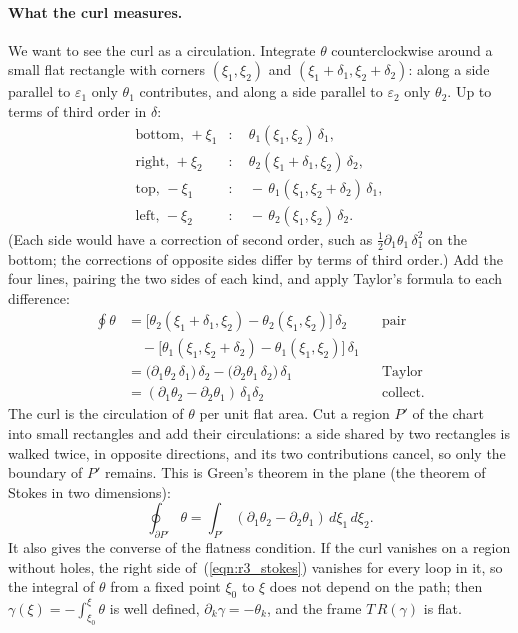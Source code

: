 \paragraph{What the curl measures.} We want to see the curl as a circulation. Integrate $\theta$ counterclockwise around a small flat rectangle with corners $(\xi_1, \xi_2)$ and $(\xi_1 + \delta_1, \xi_2 + \delta_2)$: along a side parallel to $\varepsilon_1$ only $\theta_1$ contributes, and along a side parallel to $\varepsilon_2$ only $\theta_2$. Up to terms of third order in $\delta$:
\begin{align*}
\text{bottom, } +\xi_1 &:\quad \theta_1(\xi_1, \xi_2)\,\delta_1 , \\
\text{right, } +\xi_2 &:\quad \theta_2(\xi_1 + \delta_1, \xi_2)\,\delta_2 , \\
\text{top, } -\xi_1 &:\quad -\,\theta_1(\xi_1, \xi_2 + \delta_2)\,\delta_1 , \\
\text{left, } -\xi_2 &:\quad -\,\theta_2(\xi_1, \xi_2)\,\delta_2 .
\end{align*}
(Each side would have a correction of second order, such as $\frac12\partial_1\theta_1\,\delta_1^2$ on the bottom; the corrections of opposite sides differ by terms of third order.) Add the four lines, pairing the two sides of each kind, and apply Taylor's formula to each difference:
\begin{align*}
\oint\theta &= \big[\theta_2(\xi_1 + \delta_1, \xi_2) - \theta_2(\xi_1, \xi_2)\big]\,\delta_2 && \text{pair} \\
&\quad - \big[\theta_1(\xi_1, \xi_2 + \delta_2) - \theta_1(\xi_1, \xi_2)\big]\,\delta_1 \\
&= \big(\partial_1\theta_2\,\delta_1\big)\,\delta_2 - \big(\partial_2\theta_1\,\delta_2\big)\,\delta_1 && \text{Taylor} \\
&= (\partial_1\theta_2 - \partial_2\theta_1)\,\delta_1\delta_2 && \text{collect.}
\end{align*}
The curl is the circulation of $\theta$ per unit flat area. Cut a region $P'$ of the chart into small rectangles and add their circulations: a side shared by two rectangles is walked twice, in opposite directions, and its two contributions cancel, so only the boundary of $P'$ remains. This is Green's theorem in the plane (the theorem of Stokes in two dimensions):
\begin{equation}
\label{eqn:r3_stokes}
\oint_{\partial P'} \theta = \int_{P'} (\partial_1\theta_2 - \partial_2\theta_1)\, d\xi_1\, d\xi_2 .
\end{equation}
It also gives the converse of the flatness condition. If the curl vanishes on a region without holes, the right side of~(\ref{eqn:r3_stokes}) vanishes for every loop in it, so the integral of $\theta$ from a fixed point $\xi_0$ to $\xi$ does not depend on the path; then $\gamma(\xi) = -\int_{\xi_0}^{\xi}\theta$ is well defined, $\partial_k\gamma = -\theta_k$, and the frame $T\,R(\gamma)$ is flat.

